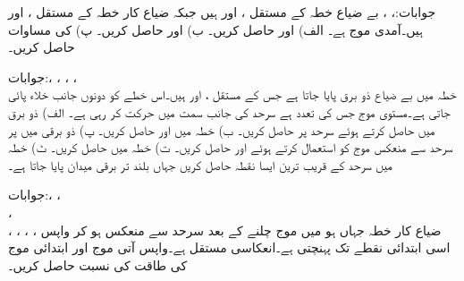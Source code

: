 جوابات:، ، 
بے ضیاع خطہ  کے مستقل ،  اور  ہیں جبکہ ضیاع کار خطہ  کے مستقل ،  اور  ہیں۔آمدی موج  ہے۔ الف)  اور  حاصل کریں۔ ب)  اور
  حاصل کریں۔ پ)  کی مساوات حاصل کریں۔

جوابات:، ، ، ،\\
خطہ  میں بے ضیاع ذو برق پایا جاتا ہے جس  کے مستقل ،  اور  ہیں۔اس خطے کو دونوں جانب خلاء پائی جاتی ہے۔مستوی موج جس کی تعدد  ہے سرحد  کی جانب  سمت میں حرکت کر رہی ہے۔ الف)  ذو برق میں  حاصل کرتے ہوئے سرحد  پر  حاصل کریں۔ ب) خطہ  میں  اور  حاصل کریں۔ پ) ذو برقی میں  پر سرحد سے منعکس موج کو استعمال کرتے ہوئے  اور  حاصل کریں۔ ت) خطہ  میں  حاصل کریں۔ ٹ) خطہ  میں سرحد کے قریب ترین ایسا نقطہ حاصل کریں جہاں بلند تر برقی میدان پایا جاتا ہے۔ 

جوابات:، ، \\ ، \\ ، ، ، ، 
ضیاع کار خطہ جہاں  ہو میں موج  چلنے کے بعد سرحد سے منعکس ہو کر واپس اسی ابتدائی نقطے تک پہنچتی ہے۔انعکاسی مستقل  ہے۔واپس آتی موج اور ابتدائی موج کی طاقت کی نسبت حاصل کریں۔

